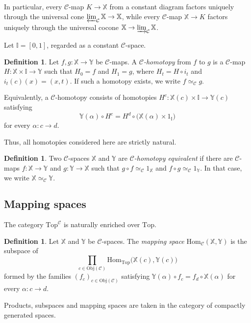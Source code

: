 \documentclass[12pt]{amsart}
\theoremstyle{definition}
\newtheorem{defi}[teo]{Definition}
\theoremstyle{remark}
\numberwithin{figure}{section}%
\newcommand{\CC}{\mathcal{C}}
\newcommand{\Top}{\mathrm{Top}}
\newcommand{\X}{\mathbb{X}}
\newcommand{\Y}{\mathbb{Y}}
\newcommand{\Hom}{\mathrm{Hom}}
\newcommand{\Obj}{\mathrm{Obj}}
\begin{document}
In particular, every $\CC$-map $K\to\X$ from a constant diagram factors
uniquely through the universal cone
$\varprojlim_{\CC}\X\to\X$, while every $\CC$-map $\X\to K$ factors
uniquely through the universal cocone
$\X\to\varinjlim_{\CC}\X$.

Let $\mathbb I=[0,1]$, regarded as a constant $\CC$-space.

\begin{defi}\label{def:C-homotopy}
Let $f,g\colon\X\to\Y$ be $\CC$-maps. A \emph{$\CC$-homotopy} from
$f$ to $g$ is a $\CC$-map
$H\colon\X\times\mathbb I\to\Y$ such that $H_0=f$ and $H_1=g$, where
$H_t=H\circ i_t$ and $i_t(c)(x)=(x,t)$. If such a homotopy exists, we
write $f\simeq_{\CC}g$.
\end{defi}

Equivalently, a $\CC$-homotopy consists of homotopies
$H^c\colon\X(c)\times\mathbb I\to\Y(c)$ satisfying
\[
\Y(\alpha)\circ H^c
=
H^d\circ\bigl(\X(\alpha)\times1_{\mathbb I}\bigr)
\]
for every $\alpha\colon c\to d$. 

Thus, all homotopies considered here are strictly natural.


\begin{defi}
Two $\CC$-spaces $\X$ and $\Y$ are \emph{$\CC$-homotopy equivalent} if
there are $\CC$-maps $f\colon\X\to\Y$ and $g\colon\Y\to\X$ such that
$g\circ f\simeq_{\CC}1_{\X}$ and
$f\circ g\simeq_{\CC}1_{\Y}$. In that case, we write
$\X\simeq_{\CC}\Y$.
\end{defi}

\subsection{Mapping spaces}

The category $\Top^{\CC}$ is naturally enriched over $\Top$.

\begin{defi}\label{def:mapping-space-diagrams}
Let $\X$ and $\Y$ be $\CC$-spaces. The \emph{mapping space}
$\Hom_{\CC}(\X,\Y)$ is the subspace of
\[
\prod_{c\in\Obj(\CC)}
\Hom_{\Top}\bigl(\X(c),\Y(c)\bigr)
\]
formed by the families $(f_c)_{c\in\Obj(\CC)}$ satisfying
$\Y(\alpha)\circ f_c=f_d\circ\X(\alpha)$ for every
$\alpha\colon c\to d$.

Products, subspaces and mapping spaces are taken in the category of
compactly generated spaces.
\end{defi}
\end{document}
